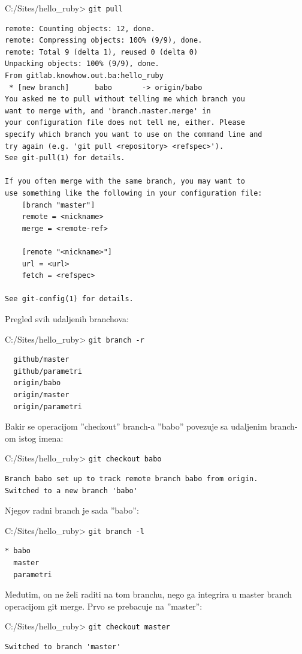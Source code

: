\documentclass[times, utf8, seminar]{fit}
\begin{document}
C:/Sites/hello\_ruby> \texttt{git pull}
\begin{lstlisting}
remote: Counting objects: 12, done.
remote: Compressing objects: 100% (9/9), done.
remote: Total 9 (delta 1), reused 0 (delta 0)
Unpacking objects: 100% (9/9), done.
From gitlab.knowhow.out.ba:hello_ruby
 * [new branch]      babo       -> origin/babo
You asked me to pull without telling me which branch you
want to merge with, and 'branch.master.merge' in
your configuration file does not tell me, either. Please
specify which branch you want to use on the command line and
try again (e.g. 'git pull <repository> <refspec>').
See git-pull(1) for details.

If you often merge with the same branch, you may want to
use something like the following in your configuration file:
    [branch "master"]
    remote = <nickname>
    merge = <remote-ref>

    [remote "<nickname>"]
    url = <url>
    fetch = <refspec>

See git-config(1) for details.
\end{lstlisting}

Pregled svih udaljenih branchova:

C:/Sites/hello\_ruby> \texttt{git branch -r}
\begin{lstlisting}
  github/master
  github/parametri
  origin/babo
  origin/master
  origin/parametri
\end{lstlisting}

Bakir se operacijom ''checkout'' branch-a ''babo'' povezuje sa udaljenim branch-om istog imena:

C:/Sites/hello\_ruby> \texttt{git checkout babo}
\begin{lstlisting}
Branch babo set up to track remote branch babo from origin.
Switched to a new branch 'babo'
\end{lstlisting}

Njegov radni branch je sada ''babo'':

C:/Sites/hello\_ruby> \texttt{git branch -l}
\begin{lstlisting}
* babo
  master
  parametri
\end{lstlisting}

Međutim, on ne želi raditi na tom branchu, nego ga integrira u master branch operacijom git merge. Prvo se prebacuje na ''master'':

C:/Sites/hello\_ruby> \texttt{git checkout master}
\begin{lstlisting}
Switched to branch 'master'
\end{lstlisting}
\end{document}
